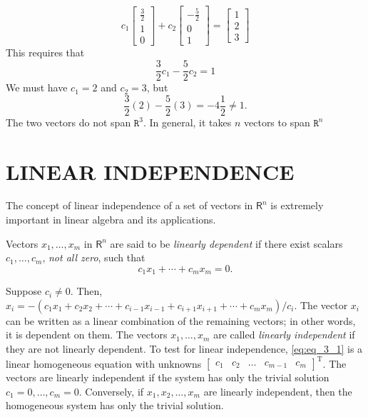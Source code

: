 \documentclass[../main.tex]{subfiles}
\begin{document}
\begin{example}
$$
c_{1}\left[\begin{array}{l}
\frac{3}{2} \\
1 \\
0
\end{array}\right]+c_{2}\left[\begin{array}{l}
-\frac{5}{2} \\
0 \\
1
\end{array}\right]=\left[\begin{array}{l}
1 \\
2 \\
3
\end{array}\right]
$$
This requires that
$$
\frac{3}{2} c_{1}-\frac{5}{2} c_{2}=1
$$
We must have $c_{1}=2$ and $c_{2}=3$, but
$$
\frac{3}{2}(2)-\frac{5}{2}(3)=-4 \frac{1}{2} \neq 1 .
$$
The two vectors do not span $\texttt{R}^{3}$. In general, it takes $n$ vectors to span $\texttt{R}^{n}$
\end{example}

\section[Linear Independence]{LINEAR INDEPENDENCE}

\begin{definition}
	\label{defn:defn_3_4}The concept of linear independence of a set of vectors in $\mathsf{R}^{n}$ is extremely important in linear algebra and its applications.

Vectors $x_{1}, \ldots, x_{m}$ in $\mathsf{R}^{n}$ are said to be \emph{linearly dependent} if there exist scalars $c_{1}, \ldots, c_{m}$, \emph{not all zero}, such that
\begin{equation}
\label{eq:eq_3_1}
c_{1} x_{1}+\cdots+c_{m} x_{m}=0 .
\end{equation}

Suppose $c_{i} \neq 0 .$ Then, $x_{i}=-\left(c_{1} x_{1}+c_{2} x_{2}+\cdots+c_{i-1} x_{i-1}+c_{i+1} x_{i+1}+\cdots+c_{m} x_{m}\right) / c_{i} .$ The vector $x_{i}$ can be written as a linear combination of the remaining vectors; in other words, it is dependent on them. The vectors $x_{1}, \ldots, x_{m}$ are called \emph{linearly independent} if they are not linearly dependent. To test for linear independence, \autoref{eq:eq_3_1} is a linear homogeneous equation with unknowns $\left[\begin{array}{lllll}c_{1} & c_{2} & \ldots & c_{m-1} & c_{m}\end{array}\right]^{\mathrm{T}}$. The vectors are linearly independent if the system has only the trivial solution $c_{1}=0, \ldots, c_{m}=0 .$ Conversely, if $x_{1}, x_{2}, \ldots, x_{m}$ are linearly independent, then the homogeneous system has only the trivial solution.
\end{definition}
\end{document}
